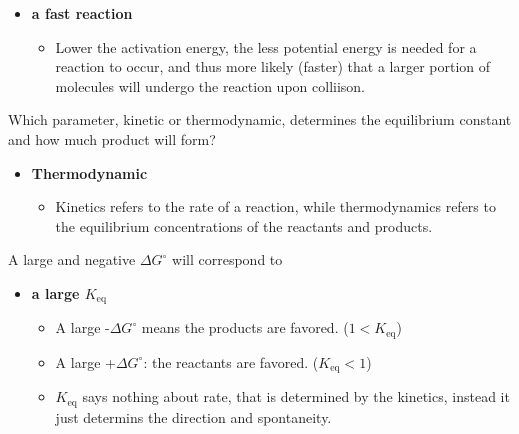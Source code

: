 \documentclass[12pt,a4paper]{article}
\begin{document}
\begin{enumerate}
        \begin{itemize}
            \item {\color{o-Sun}\textbf{a fast reaction}} 
            \begin{itemize}
                \item Lower the activation energy, the less potential energy is needed for a reaction to occur, and thus more likely (faster) that a larger portion of molecules will undergo the reaction upon colliison. 
            \end{itemize}
        \end{itemize}
    {\color{G-Moon}\item Which parameter, kinetic or thermodynamic, determines the equilibrium constant and how much product will form?}
        \begin{itemize}
            \item {\color{o-Sun}\textbf{Thermodynamic}} 
            \begin{itemize}
                \item Kinetics refers to the rate of a reaction, while thermodynamics refers to the equilibrium concentrations of the reactants and products. 
            \end{itemize}
        \end{itemize}
    {\color{G-Moon}\item A large and negative \(\Delta G^\circ\) will correspond to}
        \begin{itemize}
            \item {\color{o-Sun}\textbf{a large \(K_{\text{eq}}\)}} 
            \begin{itemize}
                \item A large {\color{neg}-\(\Delta G^\circ\)} means the {\color{neg}products} are favored. (\(1 < K_{\text{eq}}\))
                \item A large {\color{pos}+\(\Delta G^\circ\)}: the {\color{pos}reactants} are favored. (\(K_{\text{eq}} < 1\))
                \item \(K_{\text{eq}}\) says nothing about rate, that is determined by the kinetics, instead it just determins the direction and spontaneity.
            \end{itemize}
        \end{itemize}
\end{enumerate}

\newpage
{}
\end{document}
